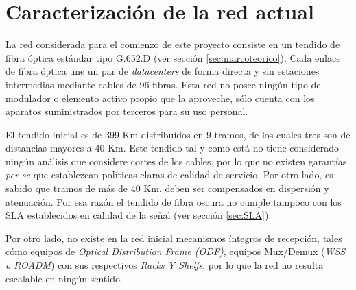 \section{Caracterización de la red actual}
\label{sec:caracterizacion}

La red considerada para el comienzo de este proyecto consiste en un 
tendido de fibra óptica estándar tipo G.652.D (ver sección 
\ref{sec:marcoteorico}). Cada enlace de fibra óptica une un par de 
\emph{datacenters} de forma directa y sin estaciones intermedias mediante
cables de 96 fibras. Esta red no posee ningún tipo de modulador o 
elemento activo propio que la aproveche, sólo cuenta con los aparatos 
suministrados por terceros para su uso personal.

El tendido inicial es de 399 Km distribuídos en 9 tramos, de los
cuales tres son de distancias mayores a 40 Km. Este tendido tal y como 
está no tiene considerado ningún análisis que considere cortes de los 
cables, por lo que no existen garantías \emph{per se} que establezcan 
políticas claras de calidad de servicio. Por otro lado, es sabido que 
tramos de más de 40 Km. deben ser compensados en dispersión y atenuación. 
Por esa razón el tendido de fibra oscura no cumple tampoco con los SLA 
establecidos en calidad de la señal (ver sección \ref{sec:SLA}).

Por otro lado, no existe en la red inicial mecanismos íntegros de 
recepción, tales cómo equipos de \textit{Optical Distribution Frame (ODF)}, 
equipos Mux/Demux (\textit{WSS o ROADM}) con sus respectivos 
\textit{Racks Y Shelfs}, por lo que la red no resulta escalable en ningún 
sentido.







